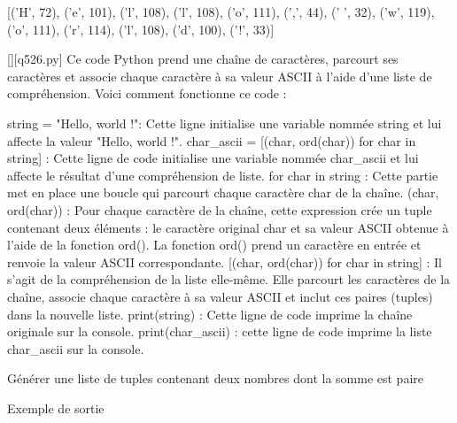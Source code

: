 [('H', 72), ('e', 101), ('l', 108), ('l', 108), ('o', 111), (',', 44), (' ', 32), ('w', 119), ('o', 111), ('r', 114), ('l', 108), ('d', 100), ('!', 33)]
        \par
        \begin{solution}
            \renewcommand{\nomfichier}{q526.py}
            \pythonfile{\chemincode \nomfichier}[][\nomfichier]
            Ce code Python prend une chaîne de caractères, parcourt ses caractères et associe chaque caractère à sa valeur ASCII à l'aide d'une liste de compréhension. Voici comment fonctionne ce code :

    string = "Hello, world !": Cette ligne initialise une variable nommée string et lui affecte la valeur "Hello, world !".
    char\_ascii = [(char, ord(char)) for char in string] : Cette ligne de code initialise une variable nommée char\_ascii et lui affecte le résultat d'une compréhension de liste.
        for char in string : Cette partie met en place une boucle qui parcourt chaque caractère char de la chaîne.
        (char, ord(char)) : Pour chaque caractère de la chaîne, cette expression crée un tuple contenant deux éléments : le caractère original char et sa valeur ASCII obtenue à l'aide de la fonction ord(). La fonction ord() prend un caractère en entrée et renvoie la valeur ASCII correspondante.
        [(char, ord(char)) for char in string] : Il s'agit de la compréhension de la liste elle-même. Elle parcourt les caractères de la chaîne, associe chaque caractère à sa valeur ASCII et inclut ces paires (tuples) dans la nouvelle liste.
    print(string) : Cette ligne de code imprime la chaîne originale sur la console.
    print(char\_ascii) : cette ligne de code imprime la liste char\_ascii sur la console.
        \end{solution}
        

        \question
        Générer une liste de tuples contenant deux nombres dont la somme est paire

Exemple de sortie

